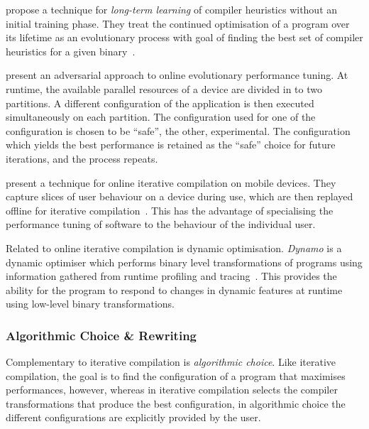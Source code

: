 \citeauthor{Tartara2013} propose a technique for \emph{long-term learning} of compiler heuristics without an initial training phase. They treat the continued optimisation of a program over its lifetime as an evolutionary process with goal of finding the best set of compiler heuristics for a given binary~\cite{Tartara2013}.

\citeauthor{Ansel2012} present an adversarial approach to online evolutionary performance tuning. At runtime, the available parallel resources of a device are divided in to two partitions. A different configuration of the application is then executed simultaneously on each partition. The configuration used for one of the configuration is chosen to be ``safe'', the other, experimental. The configuration which yields the best performance is retained as the ``safe'' choice for future iterations, and the process repeats.

\citeauthor{Mpeis2015} present a technique for online iterative compilation on mobile devices. They capture slices of user behaviour on a device during use, which are then replayed offline for iterative compilation~\cite{Mpeis2015}. This has the advantage of specialising the performance tuning of software to the behaviour of the individual user.

Related to online iterative compilation is dynamic optimisation. \emph{Dynamo} is a dynamic optimiser which performs binary level transformations of programs using information gathered from runtime profiling and tracing~\cite{Bala2000}. This provides the ability for the program to respond to changes in dynamic features at runtime using low-level binary transformations.


\subsubsection{Algorithmic Choice \& Rewriting}

Complementary to iterative compilation is \emph{algorithmic choice}. Like iterative compilation, the goal is to find the configuration of a program that maximises performances, however, whereas in iterative compilation selects the compiler transformations that produce the best configuration, in algorithmic choice the different configurations are explicitly provided by the user.

